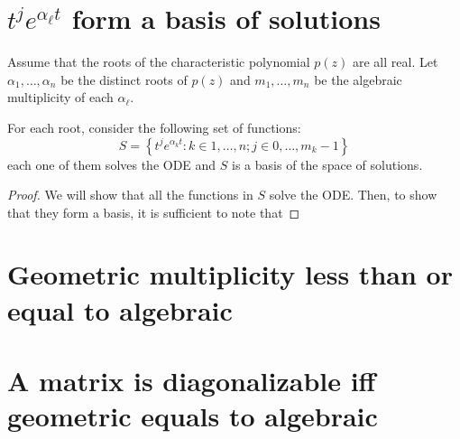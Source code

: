 \documentclass[12pt]{extarticle}
\numberwithin{equation}{section}
\begin{document}
\section{\texorpdfstring{$t^j e^{\alpha_\ell t}$ form a basis of solutions}{Basis of solutions}}

\begin{theorem}{}{}
    Assume that the roots of the characteristic polynomial $p(z)$ are all real.
    Let $\alpha_1, \dots, \alpha_n$ be the distinct roots of $p(z)$ and
    $m_1, \dots, m_n$ be the algebraic multiplicity of each $\alpha_\ell$.

    For each root, consider the following set of functions:
    \begin{equation}
        S = \left\{ t^j e^{\alpha_k t} : k \in 1, \dots, n; j \in 0, \dots, m_k -1 \right\}
    \end{equation}
    each one of them solves the ODE and $S$ is a basis of the space of solutions.
\end{theorem}

\begin{proof}
    We will show that all the functions in $S$ solve the ODE.
    Then, to show that they form a basis, it is sufficient to note that


\end{proof}

\section{Geometric multiplicity less than or equal to algebraic}

\section{A matrix is diagonalizable iff geometric equals to algebraic}
\end{document}
